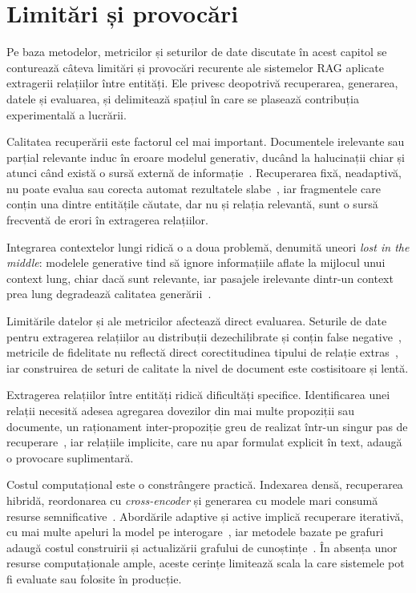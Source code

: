 \section{Limitări și provocări}

Pe baza metodelor, metricilor și seturilor de date discutate în acest capitol se conturează câteva limitări și provocări recurente ale sistemelor RAG aplicate extragerii relațiilor între entități. Ele privesc deopotrivă recuperarea, generarea, datele și evaluarea, și delimitează spațiul în care se plasează contribuția experimentală a lucrării.

Calitatea recuperării este factorul cel mai important. Documentele irelevante sau parțial relevante induc în eroare modelul generativ, ducând la halucinații chiar și atunci când există o sursă externă de informație~\cite{gao2024retrievalaugmentedgenerationlargelanguage, yan2024crag}. Recuperarea fixă, neadaptivă, nu poate evalua sau corecta automat rezultatele slabe~\cite{asai2023self}, iar fragmentele care conțin una dintre entitățile căutate, dar nu și relația relevantă, sunt o sursă frecventă de erori în extragerea relațiilor.

Integrarea contextelor lungi ridică o a doua problemă, denumită uneori \textit{lost in the middle}: modelele generative tind să ignore informațiile aflate la mijlocul unui context lung, chiar dacă sunt relevante, iar pasajele irelevante dintr-un context prea lung degradează calitatea generării~\cite{jin2024long}.

Limitările datelor și ale metricilor afectează direct evaluarea. Seturile de date pentru extragerea relațiilor au distribuții dezechilibrate și conțin false negative~\cite{tan2022redocred}, metricile de fidelitate nu reflectă direct corectitudinea tipului de relație extras~\cite{es2024ragas}, iar construirea de seturi de calitate la nivel de document este costisitoare și lentă.

Extragerea relațiilor între entități ridică dificultăți specifice. Identificarea unei relații necesită adesea agregarea dovezilor din mai multe propoziții sau documente, un raționament inter-propoziție greu de realizat într-un singur pas de recuperare~\cite{yao2019docred, edge2024graphrag}, iar relațiile implicite, care nu apar formulat explicit în text, adaugă o provocare suplimentară.

Costul computațional este o constrângere practică. Indexarea densă, recuperarea hibridă, reordonarea cu \textit{cross-encoder} și generarea cu modele mari consumă resurse semnificative~\cite{karpukhin2020dpr, borgeaud2022retro}. Abordările adaptive și active implică recuperare iterativă, cu mai multe apeluri la model pe interogare~\cite{jiang2023flare, jeong2024adaptiverag}, iar metodele bazate pe grafuri adaugă costul construirii și actualizării grafului de cunoștințe~\cite{sarthi2024raptor, gutierrez2024hipporag}. În absența unor resurse computaționale ample, aceste cerințe limitează scala la care sistemele pot fi evaluate sau folosite în producție.

